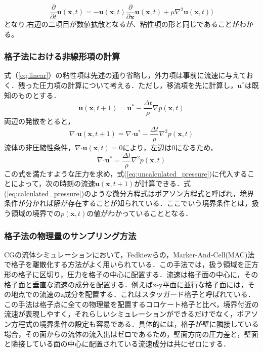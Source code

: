 \documentclass[a4j,12pt]{jreport}
\begin{document}
$$ \frac{\partial}{\partial t}\bm{u}(\bm{x},t) =  -\bm{u}(\bm{x},t)\frac{\partial}{\partial \bm{x}}\bm{u}(\bm{x},t) +\mu\nabla^2\bm{u}(\bm{x},t))$$
となり,右辺の二項目が数値拡散となるが、粘性項の形と同じであることがわかる。
\subsubsection{格子法における非線形項の計算} \label{subsec:gridpressure}
式（\ref{eq:linear}）の粘性項は先述の通り省略し，外力項は事前に流速に与えておく．残った圧力項の計算について考える．ただし，移流項を先に計算し，$\bm{u}^*$は既知のものとする．
\begin{equation}\label{eq:uncalculated_pressure}
\bm{u}(\bm{x},t+1) =  \bm{u}^* - \frac{\Delta t}{\rho}\nabla p(\bm{x},t)
\end{equation} 
両辺の発散をとると，
$$\nabla\boldsymbol{\cdot}\bm{u}(\bm{x},t+1) =  \nabla\boldsymbol{\cdot}\bm{u}^* - \frac{\Delta t}{\rho}\nabla^2 p(\bm{x},t)$$
流体の非圧縮性条件，$\nabla\boldsymbol{\cdot}\bm{u}(\bm{x},t) = 0$により，左辺は0になるため，
\begin{equation}\label{eq:calculated_pressure}
\nabla\boldsymbol{\cdot}\bm{u}^* = \frac{\Delta t}{\rho}\nabla^2 p(\bm{x},t)
\end{equation} 
この式を満たすような圧力を求め，式(\ref{eq:uncalculated_pressure})に代入することによって，次の時刻の流速$\bm{u}(\bm{x},t+1)$が計算できる．式(\ref{eq:calculated_pressure})のような微分方程式はポアソン方程式と呼ばれ，境界条件が分かれば解が存在することが知られている．ここでいう境界条件とは，扱う領域の境界での$p(\bm{x},t)$の値がわかっていることとなる．
\subsubsection{格子法の物理量のサンプリング方法} \label{subsec:grid_sampling}
CGの流体シミュレーションにおいて，Fedkiewらの，Marker-And-Cell(MAC)法で格子を離散化する方法がよく用いられている．この手法では，扱う領域を正方形の格子に区切り，圧力を格子の中心に配置する．流速は格子面の中心に，その格子面と垂直な流速の成分を配置する．例えばx-y平面に並行な格子面には，その地点での流速のz成分を配置する．これはスタッガード格子と呼ばれている．この手法は格子点に全ての物理量を配置するコロケート格子と比べ，境界付近の流速が表現しやすく，それらしいシミュレーションができるだけでなく，ポアソン方程式の境界条件の設定も容易である．具体的には，格子が壁に隣接している場合，その面からの流体の流入出はゼロであるため，壁面方向の圧力差と，壁面と隣接している面の中心に配置されている流速成分は共にゼロにする．
\end{document}
